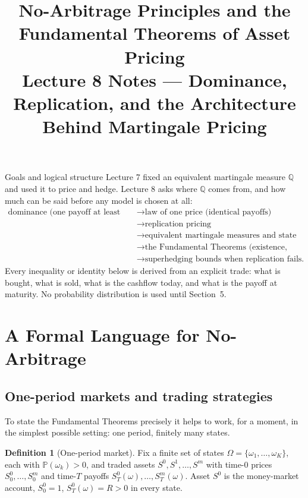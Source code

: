 \documentclass[10pt]{article}
\title{\textbf{No-Arbitrage Principles and the Fundamental Theorems of Asset Pricing}\\
\large Lecture 8 Notes --- Dominance, Replication, and the Architecture Behind Martingale Pricing}
\author{}
\date{}
\newcommand{\Pp}{\mathbb P}
\newcommand{\Q}{\mathbb Q}
\newcommand{\1}{\mathbf 1}
\theoremstyle{definition}
\newtheorem{definition}{Definition}[section]
\begin{document}
\maketitle
\vspace{-1.4em}

\begin{keyidea}{Goals and logical structure}
Lecture 7 fixed an equivalent martingale measure \(\Q\) and used it to price and
hedge. Lecture 8 asks where \(\Q\) comes from, and how much can be said before
any model is chosen at all:
\[
\begin{aligned}
\text{dominance (one payoff at least as large)}
&\longrightarrow \text{law of one price (identical payoffs)}\\
&\longrightarrow \text{replication pricing}\\
&\longrightarrow \text{equivalent martingale measures and state prices}\\
&\longrightarrow \text{the Fundamental Theorems (existence, uniqueness)}\\
&\longrightarrow \text{superhedging bounds when replication fails.}
\end{aligned}
\]
Every inequality or identity below is derived from an explicit trade: what is
bought, what is sold, what is the cashflow today, and what is the payoff at
maturity. No probability distribution is used until Section~5.
\end{keyidea}

\section{A Formal Language for No-Arbitrage}

\subsection{One-period markets and trading strategies}

To state the Fundamental Theorems precisely it helps to work, for a moment,
in the simplest possible setting: one period, finitely many states.

\begin{definition}[One-period market]
Fix a finite set of states \(\Omega=\{\omega_1,\ldots,\omega_K\}\), each with
\(\Pp(\omega_k)>0\), and traded assets \(S^0,S^1,\ldots,S^m\) with time-\(0\)
prices \(S_0^0,\ldots,S_0^m\) and time-\(T\) payoffs
\(S_T^0(\omega),\ldots,S_T^m(\omega)\). Asset \(S^0\) is the money-market
account, \(S_0^0=1\), \(S_T^0(\omega)=R>0\) in every state.
\end{definition}
\end{document}
